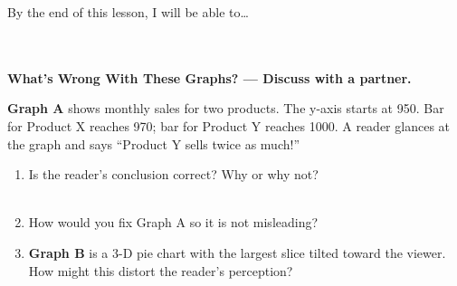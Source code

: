 \documentclass[10pt]{article}
\begin{document}
\namedateperiod

\vspace{0.12in}

\begin{objectivebox}
\small By the end of this lesson, I will be able to\dots\\[4pt]
\writeline\\[1pt]
\writeline\\[1pt]
\writeline
\end{objectivebox}

\vspace{0.1in}

\begin{vocabbox}
\end{vocabbox}

\vspace{0.1in}

\begin{hookbox}
\small\textbf{What's Wrong With These Graphs? --- Discuss with a partner.}

\vspace{8pt}
\textbf{Graph A} shows monthly sales for two products. The y-axis starts at 950.
Bar for Product X reaches 970; bar for Product Y reaches 1000.
A reader glances at the graph and says ``Product Y sells twice as much!''

\vspace{6pt}
\begin{enumerate}[leftmargin=1.5em, itemsep=6pt]
  \item Is the reader's conclusion correct? Why or why not?\\[5pt]
        \writeline\\[1pt]\writeline

  \item How would you fix Graph A so it is not misleading?\\[5pt]
        \writeline

  \item \textbf{Graph B} is a 3-D pie chart with the largest slice tilted
        toward the viewer. How might this distort the reader's perception?\\[5pt]
        \writeline\\[1pt]\writeline
\end{enumerate}
\end{hookbox}
\end{document}
